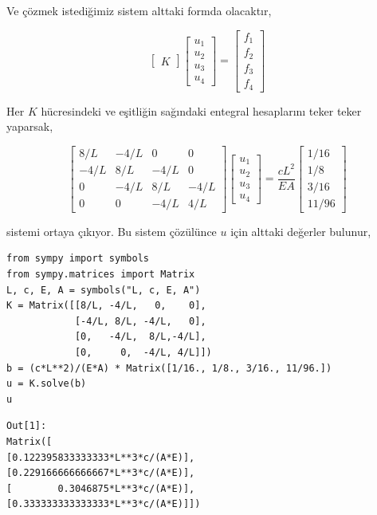 \documentclass[12pt,fleqn]{article}\usepackage{../../common}
\begin{document}
Ve çözmek istediğimiz sistem alttaki formda olacaktır,

$$
\left[\begin{array}{c}
K
\end{array}\right]
\left[\begin{array}{c}
u_1 \\ u_2 \\ u_3 \\ u_4 
\end{array}\right] = 
\left[\begin{array}{c}
f_1 \\ f_2 \\ f_3 \\ f_4 
\end{array}\right] 
$$

Her $K$ hücresindeki ve eşitliğin sağındaki entegral hesaplarını teker teker
yaparsak, 

$$
\left[\begin{array}{cccc}
8/L  & -4/L  & 0    & 0    \\
-4/L &  8/L  & -4/L & 0    \\
0    &  -4/L & 8/L  & -4/L \\
0    &  0    & -4/L & 4/L
\end{array}\right]
\left[\begin{array}{c}
u_1 \\ u_2 \\ u_3 \\ u_4 
\end{array}\right] =
\frac{cL^2}{EA}
\left[\begin{array}{c}
1/16 \\ 1/8 \\ 3/16 \\ 11/96
\end{array}\right] 
$$

sistemi ortaya çıkıyor. Bu sistem çözülünce $u$ için alttaki değerler bulunur,

\begin{verbatim}
from sympy import symbols
from sympy.matrices import Matrix
L, c, E, A = symbols("L, c, E, A")
K = Matrix([[8/L, -4/L,   0,    0],
            [-4/L, 8/L, -4/L,   0],
            [0,   -4/L,  8/L,-4/L],
            [0,     0,  -4/L, 4/L]])           
b = (c*L**2)/(E*A) * Matrix([1/16., 1/8., 3/16., 11/96.])
u = K.solve(b)
u
\end{verbatim}

\begin{verbatim}
Out[1]: 
Matrix([
[0.122395833333333*L**3*c/(A*E)],
[0.229166666666667*L**3*c/(A*E)],
[        0.3046875*L**3*c/(A*E)],
[0.333333333333333*L**3*c/(A*E)]])
\end{verbatim}
\end{document}
